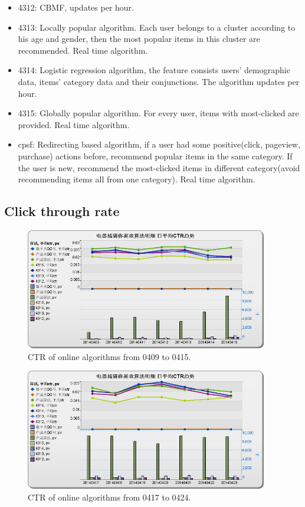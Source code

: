 \begin{itemize}
\item 4312: CBMF, updates per hour.
\item 4313: Locally popular algorithm. Each user belongs to a cluster according to his age and gender, then the most popular items in this cluster are recommended. Real time algorithm.
\item 4314: Logistic regression algorithm, the feature consists users' demographic data, items' category data and their conjunctions. The algorithm updates per hour.
\item 4315: Globally popular algorithm. For every user, items with most-clicked are provided. Real time algorithm.
\item cpsf: Redirecting based algorithm, if a user had some positive(click, pageview, purchase) actions before, recommend popular items in the same category. If the user is new, recommend the most-clicked items in different category(avoid recommending items all from one category). Real time algorithm.

\end{itemize} 

\subsection{Click through rate}


\begin{figure}
\begin{center}
\includegraphics[width=400px]{fig/yixunexp/ctr0415.png}
\caption{\label{fig:ctr0415} CTR of online algorithms from 0409 to 0415.}

\end{center}
\end{figure}

\begin{figure}
\begin{center}

\includegraphics[width=400px]{fig/yixunexp/ctr0424.png}
\caption{\label{fig:ctr0424} CTR of online algorithms from 0417 to 0424.}
\end{center}
\end{figure}

